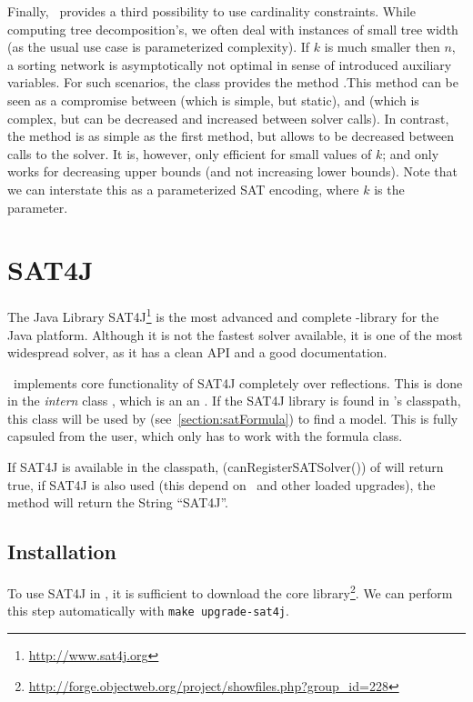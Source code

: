 \documentclass[a4paper, ukenglish, twoside, openright]{jdrasilmanual}
\begin{document}
Finally, \Jdrasil\ provides a third possibility to use cardinality
constraints. While computing tree decomposition's, we often deal with
instances of small tree width (as the usual use case is
parameterized complexity). If $k$ is much smaller then $n$, a sorting
network is asymptotically not optimal in sense of introduced auxiliary
variables. For such scenarios, the  class provides the
method .This method can be seen as a compromise between
 (which is simple, but static), and
 (which is complex, but can be
decreased and increased between solver calls). In contrast, the method
 is as simple as the first method, but
allows to be decreased between calls to the solver. It is, however,
only efficient for small values of $k$; and only works for decreasing
upper bounds (and not increasing lower bounds). Note that we can
interstate this as a parameterized SAT encoding, where $k$ is the
parameter.

\section{SAT4J}
The Java Library SAT4J\footnote{\url{http://www.sat4j.org}} is the
most advanced and complete -library for the Java
platform. Although it is not the fastest solver available, it is one
of the most widespread solver, as it has a clean API and a good
documentation.

\Jdrasil\ implements core functionality of SAT4J completely over
reflections. This is done in the \emph{intern} class
, which is an an
. If the SAT4J library is found in
\Jdrasil's classpath, this class will be used by
 (see~\ref{section:satFormula}) to find a
model. This is fully capsuled from the user, which only has to work
with the formula class. 

If SAT4J is available in the classpath,
\JMethod(canRegisterSATSolver()) of  will
return true, if SAT4J is also used (this depend on \Jdrasil\ and other
loaded upgrades), the method  will return the String
``SAT4J''. 

\subsection{Installation}
To use SAT4J in \Jdrasil, it is sufficient to download the core
library\footnote{\url{http://forge.objectweb.org/project/showfiles.php?group_id=228}}.
We can perform this step automatically with \lstinline{make upgrade-sat4j}.
\end{document}
